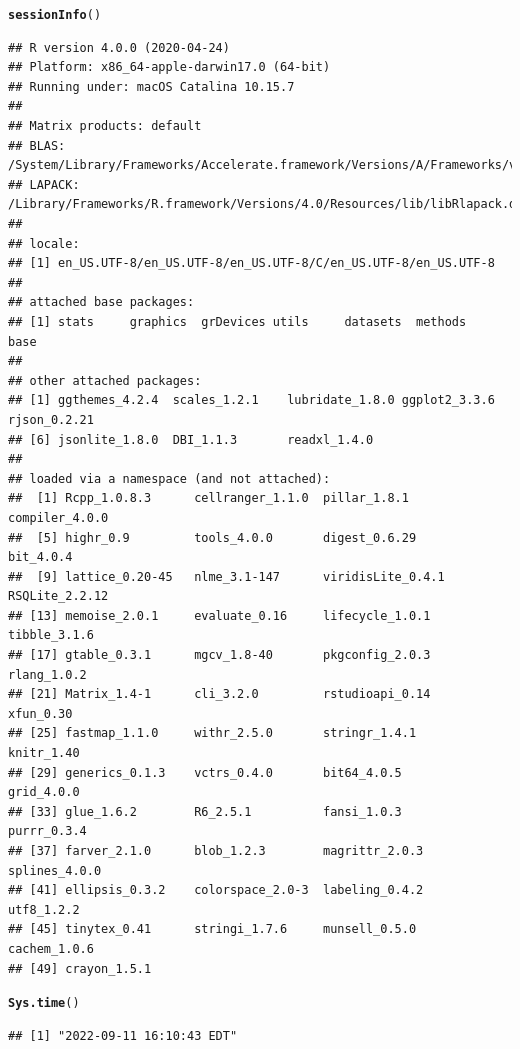 \documentclass{article}\usepackage[]{graphicx}\usepackage[]{xcolor}
\makeatletter
\newcommand{\hlstd}[1]{\textcolor[rgb]{0.345,0.345,0.345}{#1}}%
\newcommand{\hlkwd}[1]{\textcolor[rgb]{0.737,0.353,0.396}{\textbf{#1}}}%
\newenvironment{kframe}{%
 \def\at@end@of@kframe{}%
 \ifinner\ifhmode%
  \def\at@end@of@kframe{\end{minipage}}%
  \begin{minipage}{\columnwidth}%
 \fi\fi%
 \def\FrameCommand##1{\hskip\@totalleftmargin \hskip-\fboxsep
 \colorbox{shadecolor}{##1}\hskip-\fboxsep
     \hskip-\linewidth \hskip-\@totalleftmargin \hskip\columnwidth}%
 \MakeFramed {\advance\hsize-\width
   \@totalleftmargin\z@ \linewidth\hsize
   \@setminipage}}%
 {\par\unskip\endMakeFramed%
 \at@end@of@kframe}
\newenvironment{knitrout}{}{} %
\makeatother
\begin{document}
\begin{knitrout}
\color{fgcolor}\begin{kframe}
\begin{alltt}
\hlkwd{sessionInfo}\hlstd{()}
\end{alltt}
\begin{verbatim}
## R version 4.0.0 (2020-04-24)
## Platform: x86_64-apple-darwin17.0 (64-bit)
## Running under: macOS Catalina 10.15.7
## 
## Matrix products: default
## BLAS:   /System/Library/Frameworks/Accelerate.framework/Versions/A/Frameworks/vecLib.framework/Versions/A/libBLAS.dylib
## LAPACK: /Library/Frameworks/R.framework/Versions/4.0/Resources/lib/libRlapack.dylib
## 
## locale:
## [1] en_US.UTF-8/en_US.UTF-8/en_US.UTF-8/C/en_US.UTF-8/en_US.UTF-8
## 
## attached base packages:
## [1] stats     graphics  grDevices utils     datasets  methods   base     
## 
## other attached packages:
## [1] ggthemes_4.2.4  scales_1.2.1    lubridate_1.8.0 ggplot2_3.3.6   rjson_0.2.21   
## [6] jsonlite_1.8.0  DBI_1.1.3       readxl_1.4.0   
## 
## loaded via a namespace (and not attached):
##  [1] Rcpp_1.0.8.3      cellranger_1.1.0  pillar_1.8.1      compiler_4.0.0   
##  [5] highr_0.9         tools_4.0.0       digest_0.6.29     bit_4.0.4        
##  [9] lattice_0.20-45   nlme_3.1-147      viridisLite_0.4.1 RSQLite_2.2.12   
## [13] memoise_2.0.1     evaluate_0.16     lifecycle_1.0.1   tibble_3.1.6     
## [17] gtable_0.3.1      mgcv_1.8-40       pkgconfig_2.0.3   rlang_1.0.2      
## [21] Matrix_1.4-1      cli_3.2.0         rstudioapi_0.14   xfun_0.30        
## [25] fastmap_1.1.0     withr_2.5.0       stringr_1.4.1     knitr_1.40       
## [29] generics_0.1.3    vctrs_0.4.0       bit64_4.0.5       grid_4.0.0       
## [33] glue_1.6.2        R6_2.5.1          fansi_1.0.3       purrr_0.3.4      
## [37] farver_2.1.0      blob_1.2.3        magrittr_2.0.3    splines_4.0.0    
## [41] ellipsis_0.3.2    colorspace_2.0-3  labeling_0.4.2    utf8_1.2.2       
## [45] tinytex_0.41      stringi_1.7.6     munsell_0.5.0     cachem_1.0.6     
## [49] crayon_1.5.1
\end{verbatim}
\begin{alltt}
\hlkwd{Sys.time}\hlstd{()}
\end{alltt}
\begin{verbatim}
## [1] "2022-09-11 16:10:43 EDT"
\end{verbatim}
\end{kframe}
\end{knitrout}
\end{document}
